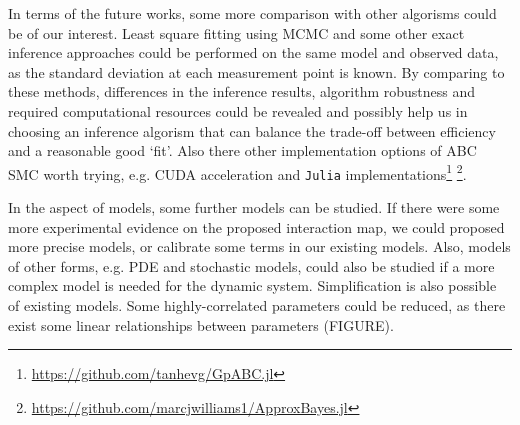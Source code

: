 
In terms of the future works, some more comparison with other algorisms could be of our interest. Least square fitting using MCMC \cite{ref:MCMC} and some other exact inference approaches could be performed on the same model and observed data, as the standard deviation at each measurement point is known. By comparing to these methods, differences in the inference results, algorithm robustness and required computational resources could be revealed and possibly help us in choosing an inference algorism that can balance the trade-off between efficiency and a reasonable good `fit'. Also there other implementation options of ABC SMC worth trying, e.g. CUDA acceleration and \verb|Julia| implementations\footnote[1]{\url{https://github.com/tanhevg/GpABC.jl}} \footnote[2]{\url{https://github.com/marcjwilliams1/ApproxBayes.jl}}.

In the aspect of models, some further models can be studied. If there were some more experimental evidence on the proposed interaction map, we could proposed more precise models, or calibrate some terms in our existing models. Also, models of other forms, e.g. PDE and stochastic models, could also be studied if a more complex model is needed for the dynamic system. Simplification is also possible of existing models. Some highly-correlated parameters could be reduced, as there exist some linear relationships between parameters (FIGURE).  

